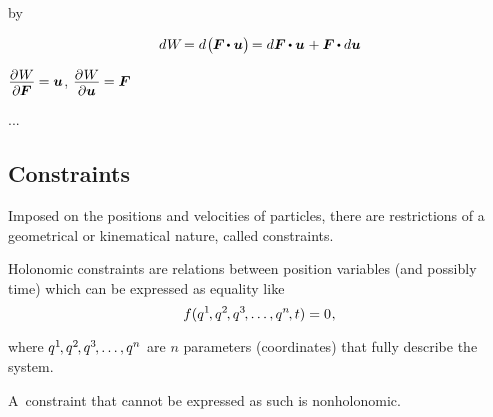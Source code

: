 by 

\nopagebreak\[
d \hspace{.1ex} W \hspace{-0.33ex}
= d \hspace{.15ex} \bigl( \hspace{-0.1ex} \bm{F} \hspace{-0.2ex} \dotp \bm{u} \bigr) \hspace{-0.25ex}
= d\bm{F} \hspace{-0.1ex} \dotp \bm{u} \hspace{.12ex} + \bm{F} \hspace{-0.1ex} \dotp d\bm{u}
\]

${\displaystyle \frac{\raisemath{-0.2em}{\partial \hspace{.1ex} W}}{\partial \hspace{-0.1ex} \bm{F}} \hspace{-0.1ex} = \bm{u}}$,
${\displaystyle \frac{\raisemath{-0.2em}{\partial \hspace{.1ex} W}}{\partial \bm{u}} \hspace{-0.1ex} = \bm{F}}$

...

\subsection*{Constraints}

Imposed on the positions and velocities of particles, there are restrictions of a geometrical or kinematical nature, called constraints.

Holonomic constraints are relations between position variables (and possibly time) which can be expressed as equality like
\begin{equation*}
f(q^{1} \hspace{-0.25ex}, q^{2} \hspace{-0.25ex}, q^{3} \hspace{-0.25ex}, \ldots, q^{n} \hspace{-0.25ex}, t) = 0
\hspace{.1ex} ,
\end{equation*}

\noindent
where ${q^{1} \hspace{-0.25ex}, q^{2} \hspace{-0.25ex}, q^{3} \hspace{-0.25ex}, \ldots, q^{n}}$ are $n$ parameters (coordinates) that fully describe the system.

A~constraint that cannot be expressed as such is nonholonomic.

